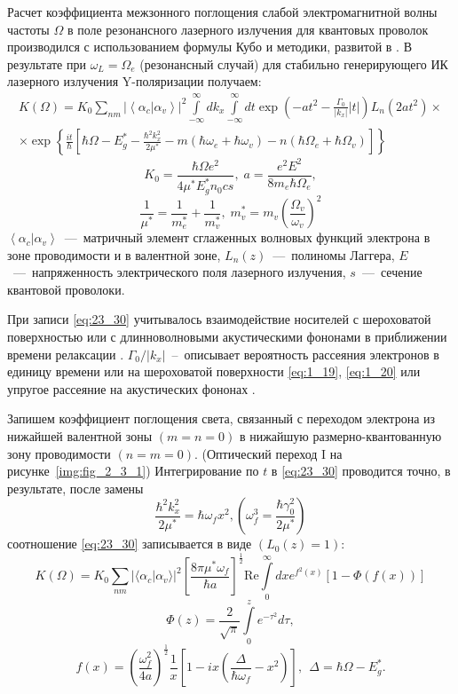 Расчет коэффициента межзонного поглощения слабой электромагнитной волны частоты $\Omega$ в поле резонансного лазерного излучения для квантовых проволок производился с использованием формулы Кубо \cite{Kubo1957a} и методики, развитой в \cite{Sinyavskii1974}. В результате при $\omega_L = \Omega_e$ (резонансный случай) для стабильно генерирующего ИК лазерного излучения Y-поляризации получаем:
\begin{multline} \label{eq:23_30}
K\left(\Omega\right)=K_0{\sum_{nm}{\left|\left\langle \alpha_c | \alpha_v \right\rangle \right|}}^2 
\int\limits_{-\infty }^{\infty }dk_x \int\limits_{-\infty }^{\infty }{dt \exp{\left( -a t^2 -\frac{\Gamma_0 }{\left|k_x\right|}|t| \right) }} L_n\left(2at^2 \right)\times\\
\times {\exp \left\{\frac{it}{\hbar }\left[\hbar \Omega-E^*_g-\frac{\hbar^2 k^2_x}{2\mu^*}-m\left(\hbar\omega_e+\hbar\omega_v\right)-n\left(\hbar\Omega_e + \hbar\Omega_v \right)\right]\right\}\ }
\end{multline}
\[
K_0=\frac{\hbar \Omega e^2}{4\mu^* E_g^* n_0 c s}, \;
a=\frac{e^2 E^2}{8 m_e \hbar\Omega_e},
\]
\[
\frac{1}{{\mu }^*}=\frac{1}{m^*_e}+\frac{1}{m^*_v},\;
m^*_v=m_v {\left(\frac{\Omega_v}{\omega_v}\right)}^2
\] 
$\left\langle \alpha_c | \alpha_v \right\rangle $~---~матричный элемент сглаженных волновых функций электрона в зоне проводимости и в валентной зоне, $L_n\left(z\right)$~---~полиномы Лаггера, $E$~---~напряженность электрического поля лазерного излучения, $s$~---~сечение квантовой проволоки. 

При записи \eqref{eq:23_30} учитывалось взаимодействие носителей с шероховатой поверхностью или с длинноволновыми акустическими фононами в приближении времени релаксации \cite{Khamidullin2002}. ${\Gamma_0}/{\left|k_x\right|}$~--~описывает вероятность рассеяния электронов в единицу времени или на шероховатой поверхности \eqref{eq:1_19}, \eqref{eq:1_20}  или упругое рассеяние на акустических фононах \cite{Khamidullin2006}.

Запишем коэффициент поглощения света, связанный с переходом электрона из нижайшей валентной зоны $(m=n=0)$ в нижайшую размерно-квантованную зону проводимости $(n=m=0)$. (Оптический переход I на рисунке~\ref{img:fig_2_3_1}) Интегрирование по $t$ в  \eqref{eq:23_30} проводится точно, в результате, после замены
\[
\frac{{\hbar }^2 k^2_x}{2\mu^*}=\hbar {\omega }_fx^2, \left({\omega }^3_f = \frac{\hbar {\gamma }^2_0}{2\mu^*}\right)
\] 
соотношение  \eqref{eq:23_30} записывается в виде $\left(L_0\left(z\right)=1\right)$:
\begin{equation} \label{eq:23_40}
K\left(\Omega\right)=K_0\sum_{nm}{ {\lvert\langle \alpha_c | \alpha_v \rangle\rvert}^2 {\left[\frac{8\pi {\mu }^*{\omega }_f}{\hbar a}\right]}^{\frac{1}{2}} \mathrm{Re} \int\limits_{0}^\infty {dx e^{f^2\left(x\right)}\left[1-\Phi \left(f\left(x\right)\right)\right]}}
\end{equation}
\[
\Phi \left(z\right)=\frac{2}{\sqrt{\pi }}\int\limits_{0}^z {e^{-{\tau}^2}}d\tau ,
\] 
\[
f\left(x\right)={\left(\frac{{\omega }^2_f}{4a}\right)}^{\frac{1}{2}}\frac{1}{x}\left[1-ix\left(\frac{\Delta }{\hbar {\omega }_f}-x^2\right)\right],\ \ \Delta =\hbar \Omega-E^*_g .
\] 

